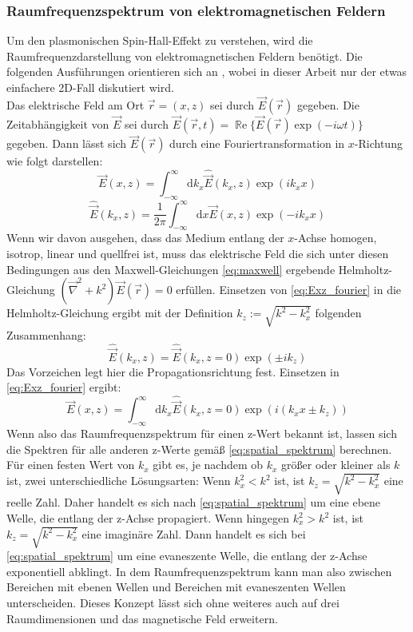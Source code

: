 \documentclass[titlepage]{article}
\renewcommand{\Re}{\operatorname{\mathbb{R}e}}
\begin{document}
	\subsubsection{Raumfrequenzspektrum von elektromagnetischen Feldern}
	Um den plasmonischen Spin-Hall-Effekt zu verstehen, wird die Raumfrequenzdarstellung von elektromagnetischen Feldern benötigt. Die folgenden Ausführungen orientieren sich an \cite{Novotny.2012b}, wobei in dieser Arbeit nur der etwas einfachere 2D-Fall diskutiert wird.\\		
	Das elektrische Feld am Ort $\vec{r} = (x, z) $ sei durch $\vec{E}({\vec{r}})$ gegeben.
	Die Zeitabhängigkeit von $\vec{E}$ sei durch $\vec{E}({\vec{r}, t})=\Re\{\vec{E}({\vec{r}})\exp(-i\omega t)\}$ gegeben. Dann lässt sich $\vec{E}({\vec{r}})$ durch eine Fouriertransformation in $x$-Richtung wie folgt darstellen:
	\begin{equation}
		\label{eq:Exz_fourier}
		\vec{E}(x,z) = \int_{-\infty}^{\infty}\mathrm{d}{k_x}\hat{\vec{E}}(k_x,z)\exp(ik_xx)				
	\end{equation}
	\begin{equation}
		\label{eq:EKxz_fourier}
		\hat{\vec{E}}(k_x,z) = \dfrac{1}{2\pi}\int_{-\infty}^{\infty}\mathrm{d}x\vec{E}(x,z)\exp(-ik_xx)
	\end{equation}
	Wenn wir davon ausgehen, dass das Medium entlang der $x$-Achse homogen, isotrop, linear und quellfrei ist, muss das elektrische Feld die sich unter diesen Bedingungen aus den Maxwell-Gleichungen \eqref{eq:maxwell} ergebende Helmholtz-Gleichung $(\vec{\nabla}^2+k^2)\vec{E}({\vec{r}}) = 0$ erfüllen. Einsetzen von \eqref{eq:Exz_fourier} in die Helmholtz-Gleichung ergibt mit der Definition $k_z := \sqrt{k^2-k_x^2}$ folgenden Zusammenhang:
	\begin{equation}
		\label{eq:spatial_spektrum}
		\hat{\vec{E}}(k_x,z) =\hat{\vec{E}}(k_x,z= 0) \exp(\pm ik_ z)
	\end{equation}
	Das Vorzeichen legt hier die Propagationsrichtung fest.
	Einsetzen in \eqref{eq:Exz_fourier} ergibt:
	\begin{equation}
		\label{eq:Espatial_spektrum}
		\vec{E}(x,z) = \int_{-\infty}^{\infty}\mathrm{d}{k_x}\hat{\vec{E}}(k_x,z= 0)\exp(i(k_xx\pm k_ z))
	\end{equation}
	Wenn also das Raumfrequenzspektrum für einen z-Wert bekannt ist, lassen sich die Spektren für alle anderen z-Werte gemäß \eqref{eq:spatial_spektrum} berechnen. Für einen festen Wert von $k_x$ gibt es, je nachdem ob $k_x$ größer oder kleiner als $k$ ist, zwei unterschiedliche Lösungsarten: Wenn $k_x^2 < k^2$ ist, ist $k_z = \sqrt{k^2-k_x^2}$ eine reelle Zahl. Daher handelt es sich nach \eqref{eq:spatial_spektrum} um eine ebene Welle, die entlang der z-Achse propagiert.
	Wenn hingegen $k_x^2 > k^2$ ist, ist $k_z = \sqrt{k^2-k_x^2}$ eine imaginäre Zahl. Dann handelt es sich bei \eqref{eq:spatial_spektrum} um eine evaneszente Welle, die entlang der z-Achse exponentiell abklingt. In dem Raumfrequenzspektrum kann man also zwischen Bereichen mit ebenen Wellen und Bereichen mit evaneszenten Wellen unterscheiden. Dieses Konzept lässt sich ohne weiteres auch auf drei Raumdimensionen und das magnetische Feld erweitern.
\end{document}
